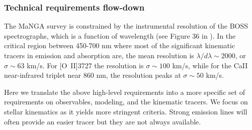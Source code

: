 \documentclass[preprint,11pt]{aastex}
\begin{document}

\subsubsection{\bf Technical requirements flow-down}
The MaNGA survey is constrained by the instrumental resolution of the
BOSS spectrographs, which is a function of wavelength (see Figure 36
in \citealt{smee12}). In the critical region between 450-700 nm where
most of the significant kinematic tracers in emission and absorption
are, the mean resolution is $\lambda/d\lambda \sim 2000$, or $\sigma
\sim 63$ km/s. For [O~II]3727 the resolution is $\sigma \sim 100$
km/s, while for the CaII near-infrared triplet near 860 nm, the
resolution peaks at $\sigma \sim 50$ km/s.

Here we translate the above high-level requirements into a more
specific set of requirements on observables, modeling, and the
kinematic tracers. We focus on stellar kinematics as it yields more
stringent criteria. Strong emission lines will often provide an easier
tracer but they are not always available.
\end{document}
